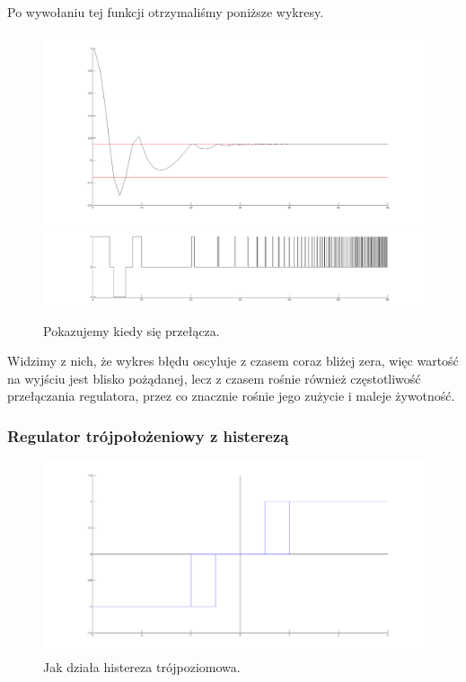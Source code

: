 \documentclass[a4paper,10pt]{article}
\begin{document}
Po wywołaniu tej funkcji otrzymaliśmy poniższe wykresy.

\begin{figure}[!h]
    \centering
	\includegraphics[width=120mm]{CW3-trojpolozeniowy-e-n015-a0.png}
	\includegraphics[width=120mm]{CW3-trojpolozeniowy-u-n015-a0.png}
	\caption{Pokazujemy kiedy się przełącza.}
    \label{fig:Rysunek}
\end{figure}

\newpage Widzimy z nich, że wykres błędu oscyluje z czasem coraz bliżej zera, więc wartość na wyjściu jest blisko pożądanej, lecz z czasem rośnie również częstotliwość przełączania regulatora, przez co znacznie rośnie jego zużycie i maleje żywotność.

\subsubsection{Regulator trójpołożeniowy z histerezą}\label{sec:r3h}%


\begin{figure}[!h]
    \centering
	\includegraphics[width=120mm]{CW3-histereza-trojpoziomowa.png}
	\caption{Jak działa histereza trójpoziomowa.}
    \label{fig:Rysunek}
\end{figure}
\end{document}
